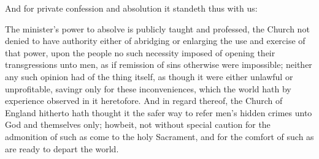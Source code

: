 And for private confession and absolution it standeth thus with us:

The minister’s power to absolve is publicly taught and professed, the Church not denied to have authority either of abridging or enlarging the use and exercise of that power, upon the people no such necessity imposed of opening their transgressions unto men, as if remission of sins otherwise were impossible; neither any such opinion had of the thing itself, as though it were either unlawful or unprofitable, savingr only for these inconveniences, which the world hath by experience observed in it heretofore. And in regard thereof, the Church of England hitherto hath thought it the safer way to refer men’s hidden crimes unto God and themselves only; howbeit, not without special caution for the admonition of such as come to the holy Sacrament, and for the comfort of such as are ready to depart the world.

